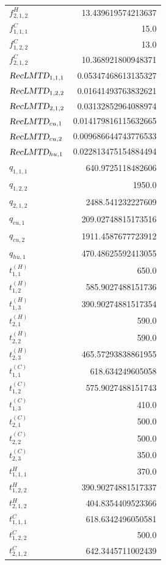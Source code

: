 \documentclass{article}%
\begin{document}
\begin{multicols*}{3}
\begin{supertabular}{lr}
	$f_{2,1,2}^{H}$ & 13.439619574213637 \\%
	$f_{1,1,1}^{C}$ & 15.0 \\%
	$f_{1,2,2}^{C}$ & 13.0 \\%
	$f_{2,1,2}^{C}$ & 10.368921800948371 \\%
	$\textsl{RecLMTD}_{1,1,1}$ & 0.05347468613135327 \\%
	$\textsl{RecLMTD}_{1,2,2}$ & 0.01641493763832621 \\%
	$\textsl{RecLMTD}_{2,1,2}$ & 0.03132852964088974 \\%
	$\textsl{RecLMTD}_{cu,1}$ & 0.014179816115632665 \\%
	$\textsl{RecLMTD}_{cu,2}$ & 0.009686644743776533 \\%
	$\textsl{RecLMTD}_{hu,1}$ & 0.022813475154884494 \\%
	$q_{1,1,1}$ & 640.9725118482606 \\%
	$q_{1,2,2}$ & 1950.0 \\%
	$q_{2,1,2}$ & 2488.541232227609 \\%
	$q_{cu,1}$ & 209.02748815173516 \\%
	$q_{cu,2}$ & 1911.4587677723912 \\%
	$q_{hu,1}$ & 470.48625592413055 \\%
	$t_{1,1}^{(H)}$ & 650.0 \\%
	$t_{1,2}^{(H)}$ & 585.9027488151736 \\%
	$t_{1,3}^{(H)}$ & 390.90274881517354 \\%
	$t_{2,1}^{(H)}$ & 590.0 \\%
	$t_{2,2}^{(H)}$ & 590.0 \\%
	$t_{2,3}^{(H)}$ & 465.57293838861955 \\%
	$t_{1,1}^{(C)}$ & 618.634249605058 \\%
	$t_{1,2}^{(C)}$ & 575.9027488151743 \\%
	$t_{1,3}^{(C)}$ & 410.0 \\%
	$t_{2,1}^{(C)}$ & 500.0 \\%
	$t_{2,2}^{(C)}$ & 500.0 \\%
	$t_{2,3}^{(C)}$ & 350.0 \\%
	$t_{1,1,1}^{H}$ & 370.0 \\%
	$t_{1,2,2}^{H}$ & 390.90274881517337 \\%
	$t_{2,1,2}^{H}$ & 404.8354409523366 \\%
	$t_{1,1,1}^{C}$ & 618.6342496050581 \\%
	$t_{1,2,2}^{C}$ & 500.0 \\%
	$t_{2,1,2}^{C}$ & 642.3445711002439 \\%

\end{supertabular}
\end{multicols*}
\end{document}
